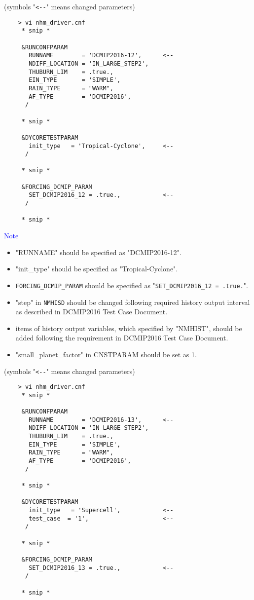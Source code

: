 \documentclass[a4paper]{article}
\begin{document}
 \vspace{0.5cm}

 (symbols "\verb|<--|" means changed parameters)
 \begin{verbatim}
    > vi nhm_driver.cnf
     * snip *

     &RUNCONFPARAM
       RUNNAME        = 'DCMIP2016-12',      <--
       NDIFF_LOCATION = 'IN_LARGE_STEP2',
       THUBURN_LIM    = .true.,
       EIN_TYPE       = 'SIMPLE',
       RAIN_TYPE      = "WARM",
       AF_TYPE        = 'DCMIP2016',
      /

     * snip *

     &DYCORETESTPARAM
       init_type   = 'Tropical-Cyclone',     <--
      /

     * snip *

     &FORCING_DCMIP_PARAM
       SET_DCMIP2016_12 = .true.,            <--
      /

     * snip *
 \end{verbatim}

 \noindent \textcolor{blue}{{\sf Note}}
 \begin{itemize}
   \item "RUNNAME" should be specified as "DCMIP2016-12".
   \item "init\_type" should be specified as "Tropical-Cyclone".
   \item \verb|FORCING_DCMIP_PARAM| should be specified as "\verb|SET_DCMIP2016_12 = .true.|".
   \item "step" in \verb|NMHISD| should be changed following required history output interval
           as described in DCMIP2016 Test Case Document.
   \item items of history output variables, which specified by "NMHIST", should be added
         following the requirement in DCMIP2016 Test Case Document.
   \item "small\_planet\_factor" in CNSTPARAM should be set as 1.
 \end{itemize}


 \vspace{0.5cm}

 (symbols "\verb|<--|" means changed parameters)
 \begin{verbatim}
    > vi nhm_driver.cnf
     * snip *

     &RUNCONFPARAM
       RUNNAME        = 'DCMIP2016-13',      <--
       NDIFF_LOCATION = 'IN_LARGE_STEP2',
       THUBURN_LIM    = .true.,
       EIN_TYPE       = 'SIMPLE',
       RAIN_TYPE      = "WARM",
       AF_TYPE        = 'DCMIP2016',
      /

     * snip *

     &DYCORETESTPARAM
       init_type   = 'Supercell',            <--
       test_case  = '1',                     <--
      /

     * snip *

     &FORCING_DCMIP_PARAM
       SET_DCMIP2016_13 = .true.,            <--
      /

     * snip *
 \end{verbatim}
\end{document}

